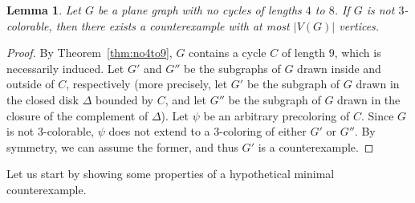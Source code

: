 \documentclass[12pt,twoside,openright,a4paper]{book}
\newtheorem{lemma}[theorem]{Lemma}
\begin{document}
\begin{lemma}\label{lemma:no4to8-exce}
Let $G$ be a plane graph with no cycles of lengths $4$ to $8$.  If $G$ is not $3$-colorable,
then there exists a counterexample with at most $|V(G)|$ vertices.
\end{lemma}
\begin{proof}
By Theorem~\ref{thm:no4to9}, $G$ contains a cycle $C$ of length $9$, which is necessarily induced.
Let $G'$ and $G''$ be the subgraphs of $G$ drawn inside and outside of $C$, respectively
(more precisely, let $G'$ be the subgraph of $G$ drawn in the closed disk $\Delta$ bounded by $C$, and let $G''$ be the
subgraph of $G$ drawn in the closure of the complement of $\Delta$).
Let $\psi$ be an arbitrary precoloring of $C$.  Since $G$ is not $3$-colorable,
$\psi$ does not extend to a $3$-coloring of either $G'$ or $G''$. By symmetry, we can assume the former,
and thus $G'$ is a counterexample.
\end{proof}

Let us start by showing some properties of a hypothetical minimal counterexample.
\end{document}
